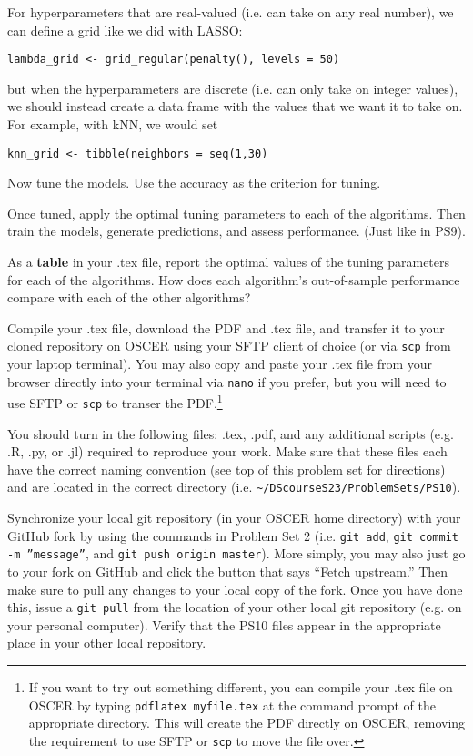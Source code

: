 \documentclass[12pt,english]{exam}
\begin{document}
\begin{questions}
For hyperparameters that are real-valued (i.e. can take on any real number), we can define a grid like we did with LASSO:

\texttt{lambda\_grid <- grid\_regular(penalty(), levels = 50)}

\bigskip
but when the hyperparameters are discrete (i.e. can only take on integer values), we should instead create a data frame with the values that we want it to take on. For example, with kNN, we would set

\texttt{knn\_grid <- tibble(neighbors = seq(1,30)}

\question Now tune the models. Use the accuracy as the criterion for tuning. %

\question Once tuned, apply the optimal tuning parameters to each of the algorithms. Then train the models, generate predictions, and assess performance. (Just like in PS9).

\question As a \textbf{table} in your .tex file, report the optimal values of the tuning parameters for each of the algorithms. How does each algorithm's out-of-sample performance compare with each of the other algorithms?

\question Compile your .tex file, download the PDF and .tex file, and transfer it to your cloned repository on OSCER using your SFTP client of choice (or via \texttt{scp} from your laptop terminal). You may also copy and paste your .tex file from your browser directly into your terminal via \texttt{nano} if you prefer, but you will need to use SFTP or \texttt{scp} to transer the PDF.\footnote{If you want to try out something different, you can compile your .tex file on OSCER by typing \texttt{pdflatex myfile.tex} at the command prompt of the appropriate directory. This will create the PDF directly on OSCER, removing the requirement to use SFTP or \texttt{scp} to move the file over.}

\question You should turn in the following files: .tex, .pdf, and any additional scripts (e.g. .R, .py, or .jl) required to reproduce your work.  Make sure that these files each have the correct naming convention (see top of this problem set for directions) and are located in the correct directory (i.e. \texttt{\textasciitilde/DScourseS23/ProblemSets/PS10}).

\question Synchronize your local git repository (in your OSCER home directory) with your GitHub fork by using the commands in Problem Set 2 (i.e. \texttt{git add}, \texttt{git commit -m ''message''}, and \texttt{git push origin master}). More simply, you may also just go to your fork on GitHub and click the button that says ``Fetch upstream.'' Then make sure to pull any changes to your local copy of the fork. Once you have done this, issue a \texttt{git pull} from the location of your other local git repository (e.g. on your personal computer). Verify that the PS10 files appear in the appropriate place in your other local repository.

\end{questions}
\end{document}
